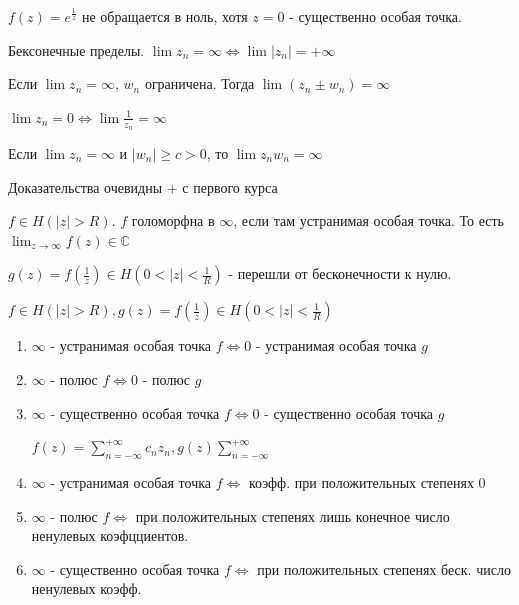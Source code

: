 \begin{example}
    $f(z) = e^{\frac{1}{z}}$ не обращается в ноль, хотя $z = 0$ - существенно особая точка.
\end{example}

\begin{definition}
    Бексонечные пределы. $\lim z_n = \infty \Longleftrightarrow \lim |z_n| = +\infty$ 
\end{definition}

\begin{properties}

    \item Если $\lim z_n = \infty$, $w_n$ ограничена. Тогда $\lim (z_n \pm w_n) = \infty$
    \item $\lim z_n = 0 \Longleftrightarrow \lim \frac{1}{z_n} = \infty$
    \item Если $\lim z_n = \infty$ и $|w_n| \geqslant c > 0$, то $\lim z_nw_n = \infty$
    
    Доказательства очевидны + с первого курса 
\end{properties}

\begin{definition}
    $f \in H(|z| > R)$. $f$ голоморфна в $\infty$, если там устранимая особая точка. То есть $\lim_{z \to \infty} f(z) \in \mathbb{C}$

    \begin{remark}
        $g(z) = f(\frac{1}{z}) \in H(0 < |z| < \frac{1}{R})$ - перешли от бесконечности к нулю.
    \end{remark}
\end{definition}

\begin{remark}
    $f \in H(|z| > R), g(z) = f(\frac{1}{z}) \in H(0 < |z| < \frac{1}{R})$
    \begin{enumerate}
        \item $\infty$ - устранимая особая точка $f \Longleftrightarrow 0$ - устранимая особая точка $g$
        \item $\infty$ - полюс $f \Longleftrightarrow 0$ - полюс $g$
        \item $\infty$ - существенно особая точка $f \Longleftrightarrow 0$ - существенно особая точка $g$
        
        $f(z) = \sum_{n = -\infty}^{+\infty} c_nz_n, g(z) \sum_{n = -\infty}^{+\infty}$
        \item $\infty$ - устранимая особая точка $f \Longleftrightarrow$ коэфф. при положительных степенях $0$
        \item $\infty$ - полюс $f \Longleftrightarrow$ при положительных степенях лишь конечное число ненулевых коэфцциентов.
        \item $\infty$ - существенно особая точка $f \Longleftrightarrow$ при положительных степенях беск. число ненулевых коэфф.
    \end{enumerate}
\end{remark}

